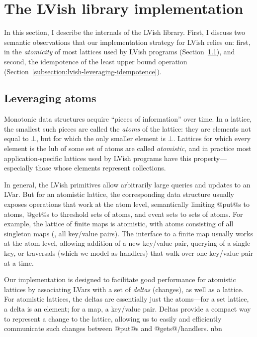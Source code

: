 \section{The LVish library implementation}\label{s:lvish-internals}


In this section, I describe the internals of the LVish library. First,
I discuss two semantic observations that our implementation strategy
for LVish relies on: first, in the \emph{atomicity} of most lattices
used by LVish programs
(Section~\ref{subsection:lvish-leveraging-atoms}), and second, the
idempotence of the least upper bound operation
(Section~\ref{subsection:lvish-leveraging-idempotence}).

\subsection{Leveraging atoms}\label{subsection:lvish-leveraging-atoms}

Monotonic data structures acquire ``pieces of information'' over time.
In a lattice, the smallest such pieces are called the \emph{atoms} of
the lattice: they are elements not equal to $\bot$, but for which the
only smaller element is $\bot$.  Lattices for which every element is
the lub of some set of atoms are called \emph{atomistic}, and in
practice most application-specific lattices used by LVish programs
have this property---especially those whose elements represent
collections.

In general, the LVish primitives allow arbitrarily large queries and
updates to an LVar.  But for an atomistic lattice, the corresponding
data structure usually exposes operations that work at the atom level,
semantically limiting @put@s to atoms, @get@s to threshold sets of
atoms, and event sets to sets of atoms.  For example, the lattice of
finite maps is atomistic, with atoms consisting of all singleton maps
(\ie, all key/value pairs).  The interface to a finite map usually
works at the atom level, allowing addition of a new key/value pair,
querying of a single key, or traversals (which we model as handlers)
that walk over one key/value pair at a time.

Our implementation is designed to facilitate good performance for
atomistic lattices by associating LVars with a set of \emph{deltas}
(changes), as well as a lattice.  For atomistic lattices, the deltas
are essentially just the atoms---for a set lattice, a delta is an
element; for a map, a key/value pair.  Deltas provide a compact way to
represent a change to the lattice, allowing us to easily and
efficiently communicate such changes between @put@s and
@gets@/handlers.
nbn

